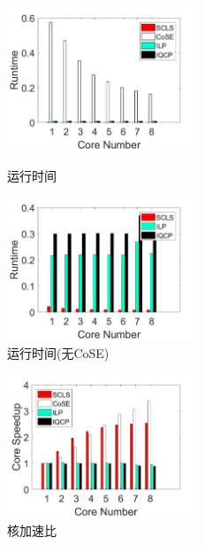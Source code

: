 \begin{figure}[htb]
\centering
\begin{minipage}[t]{0.3\linewidth}
\centering
\includegraphics[width=2.25in]{figures/runtime}
\caption{运行时间}
\label{fig:normalization runtime}
\end{minipage}
\hfill
\begin{minipage}[t]{0.3\linewidth}
\centering
\includegraphics[width=2.25in]{figures/Runtime_noKSP_noCOSE}\\
  \caption{运行时间(无CoSE)}\label{fig:Runtime_noKSP_noCOSE}
\end{minipage}
\hfill
\begin{minipage}[t]{0.3\linewidth}
\centering
\includegraphics[width=2.25in]{figures/speedup}
\caption{核加速比}
\label{fig:Speedup}
\end{minipage}
\end{figure}


